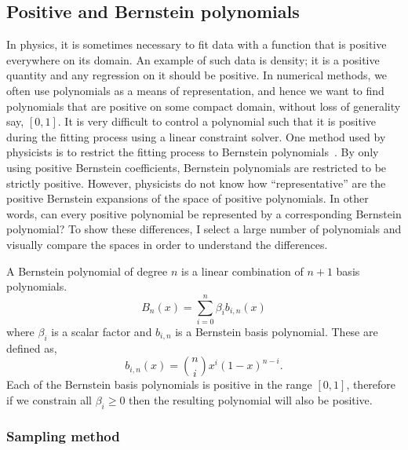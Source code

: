 \subsection{Positive and Bernstein polynomials}
\label{sec:bernstein}

In physics, it is sometimes necessary to fit data with a function that is
positive everywhere on its domain.  An example of such data is density; it
is a positive quantity and any regression on it should be positive.  In
numerical methods, we often use polynomials as a means of representation, and
hence we want to find polynomials that are positive on some compact domain,
without loss of generality say, $[0,1]$.
It is very difficult to control a polynomial
such that it is positive during the fitting process using a linear constraint
solver. One method used by physicists is to restrict the
fitting process to Bernstein polynomials~\cite{Phillips:2003}. By only using 
positive Bernstein coefficients, Bernstein
polynomials are restricted to be strictly positive.  However,
physicists do not know how ``representative'' are the positive Bernstein
expansions of the space of positive polynomials. In other words, can every
positive polynomial be represented by a corresponding Bernstein polynomial? 
To show these differences, I
select a large number of polynomials and visually compare the spaces in
order to understand the differences.

A Bernstein polynomial of degree \(n\) is a linear combination of
\(n+1\) basis polynomials. 
\[
B_n(x) = \sum_{i=0}^n \beta_i b_{i,n}(x) 
\]
where \(\beta_i\) is a scalar factor and
\(b_{i,n}\) is a Bernstein basis polynomial. These are defined as, 
\[
b_{i,n}(x) = {n \choose i} x^i (1-x)^{n-i}.
\] Each of the
Bernstein basis polynomials is positive in the range \([0,1]\), therefore
if we constrain all \(\beta_i \ge 0\) then the resulting polynomial will
also be positive.

\subsubsection{Sampling method}


